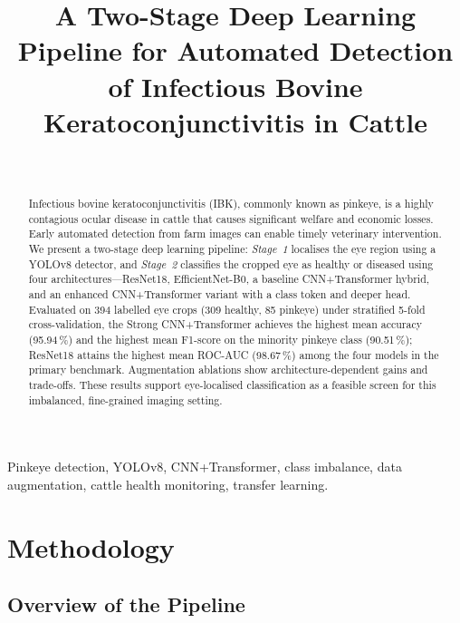 \documentclass[10pt,journal,compsoc]{IEEEtran}
\begin{document}
\title{A Two-Stage Deep Learning Pipeline for Automated Detection of
Infectious Bovine Keratoconjunctivitis in Cattle}

\author{%
  \\
}

\maketitle

\begin{abstract}
Infectious bovine keratoconjunctivitis (IBK), commonly known as pinkeye,
is a highly contagious ocular disease in cattle that causes significant
welfare and economic losses. Early automated detection from farm images
can enable timely veterinary intervention. We present a two-stage deep
learning pipeline: \emph{Stage~1} localises the eye region using a
YOLOv8 detector, and \emph{Stage~2} classifies the cropped eye as
healthy or diseased using four architectures---ResNet18,
EfficientNet-B0, a baseline CNN+Transformer hybrid, and an enhanced
CNN+Transformer variant with a class token and deeper head.
Evaluated on 394 labelled eye crops (309 healthy, 85 pinkeye) under
stratified 5-fold cross-validation, the Strong CNN+Transformer achieves
the highest mean accuracy (95.94\,\%) and the highest mean F1-score on
the minority pinkeye class (90.51\,\%); ResNet18 attains the highest
mean ROC-AUC (98.67\,\%) among the four models in the primary benchmark.
Augmentation ablations show architecture-dependent gains and trade-offs.
These results support eye-localised classification as a feasible screen
for this imbalanced, fine-grained imaging setting.
\end{abstract}

\begin{IEEEkeywords}
Pinkeye detection, YOLOv8, CNN+Transformer, class imbalance,
data augmentation, cattle health monitoring, transfer learning.
\end{IEEEkeywords}

\section{Methodology}
\label{sec:methodology}

\subsection{Overview of the Pipeline}
\label{subsec:overview}
\end{document}
